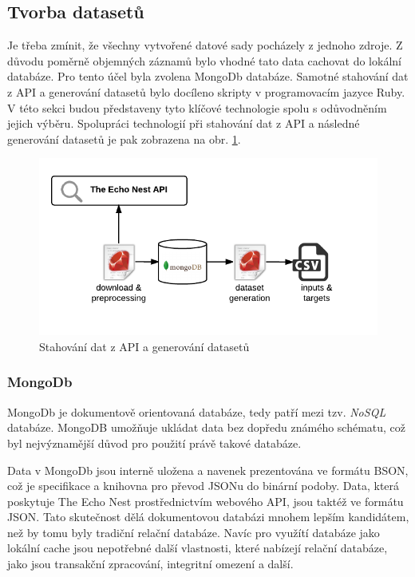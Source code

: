 \documentclass[thesis=M,czech]{FITthesis}[2012/06/26]
\begin{document}
\subsection{Tvorba datasetů}

Je třeba zmínit, že všechny vytvořené datové sady pocházely z jednoho zdroje. Z důvodu poměrně objemných záznamů bylo vhodné tato data cachovat do lokální databáze. Pro tento účel byla zvolena MongoDb databáze. Samotné stahování dat z API a generování datasetů bylo docíleno skripty v programovacím jazyce Ruby. V této sekci budou představeny tyto klíčové technologie spolu s odůvodněním jejich výběru. Spolupráci technologií při stahování dat z API a následné generování datasetů je pak zobrazena na obr. \ref{fig:down}.

\begin{figure}[htbp]
\begin{center}
	\includegraphics[scale=1]{download_generate.png}
\caption{Stahování dat z API a generování datasetů}
\label{fig:down}
\end{center}
\end{figure}

\subsubsection*{MongoDb}
MongoDb je dokumentově orientovaná databáze, tedy patří mezi tzv. \textit{NoSQL} databáze. MongoDB umožňuje ukládat data bez dopředu známého schématu, což byl nejvýznamější důvod pro použití právě takové databáze.

Data v MongoDb jsou interně uložena a navenek prezentována ve formátu BSON, což je specifikace a knihovna pro převod JSONu do binární podoby. Data, která poskytuje The Echo Nest prostřednictvím webového API, jsou taktéž ve formátu JSON. Tato skutečnost dělá dokumentovou databázi mnohem lepším kandidátem, než by tomu byly tradiční relační databáze. Navíc pro využítí databáze jako lokální cache jsou nepotřebné další vlastnosti, které nabízejí relační databáze, jako jsou transakční zpracování, integritní omezení a další.
\end{document}
